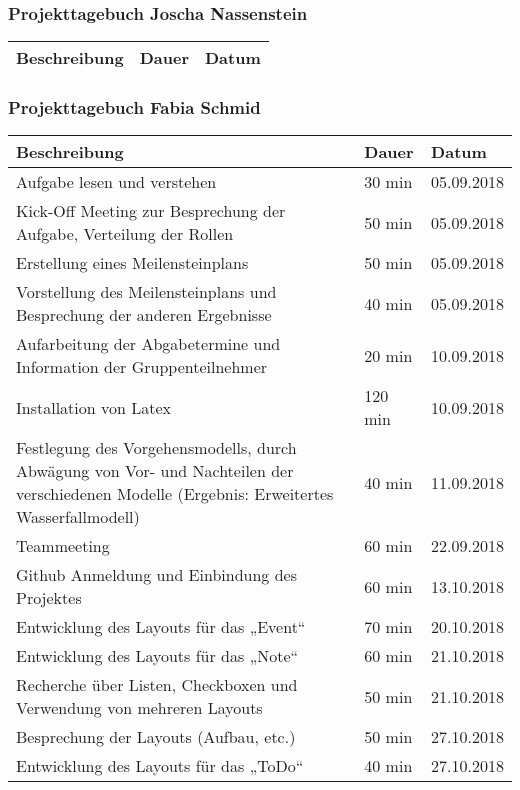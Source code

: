\newpage
\subsubsection{Projekttagebuch Joscha Nassenstein}
\begin{longtable}{|p{10cm}|p{2cm}|p{2cm}|}
\hline
{\textbf{Beschreibung}} & {\textbf{Dauer}} & {\textbf{Datum}} \\ \hline

\end{longtable}

\newpage
\subsubsection{Projekttagebuch Fabia Schmid}
\begin{longtable}{|p{10cm}|p{2cm}|p{2cm}|}
\hline
{\textbf{Beschreibung}} & {\textbf{Dauer}} & {\textbf{Datum}} \\ \hline
Aufgabe lesen und verstehen & 30 min & 05.09.2018 \\ \hline
Kick-Off Meeting zur Besprechung der Aufgabe, Verteilung der Rollen & 50 min & 05.09.2018 \\ \hline
Erstellung eines Meilensteinplans & 50 min & 05.09.2018 \\ \hline
Vorstellung des Meilensteinplans und Besprechung der anderen Ergebnisse & 40 min & 05.09.2018 \\ \hline
Aufarbeitung der Abgabetermine und Information der Gruppenteilnehmer  & 20 min & 10.09.2018 \\ \hline
Installation von Latex & 120 min & 10.09.2018 \\ \hline
Festlegung des Vorgehensmodells, durch Abwägung von Vor- und Nachteilen der verschiedenen Modelle (Ergebnis: Erweitertes Wasserfallmodell)
 & 40 min & 11.09.2018 \\ \hline
Teammeeting & 60 min & 22.09.2018 \\ \hline
Github Anmeldung und Einbindung des Projektes & 60 min & 13.10.2018 \\ \hline
Entwicklung des Layouts für das „Event“  & 70 min & 20.10.2018 \\ \hline
Entwicklung des Layouts für das „Note“ & 60 min & 21.10.2018 \\ \hline
Recherche über Listen, Checkboxen und Verwendung von mehreren Layouts & 50 min & 21.10.2018 \\ \hline
Besprechung der Layouts (Aufbau, etc.) & 50 min & 27.10.2018 \\ \hline
Entwicklung des Layouts für das „ToDo“ & 40 min & 27.10.2018 \\ \hline

\end{longtable}
